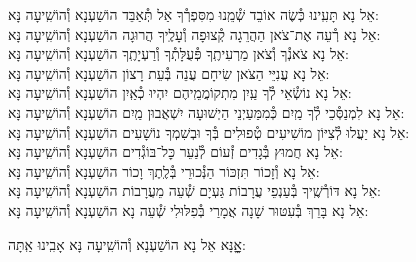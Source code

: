 \documentclass[twoside, openany, parskip=half, 11pt]{book}
\begin{document}
\begin{small}
אֵל נָא תָּעִֽינוּ כְּ֯שֶׂה אוֹבֵד שְׁ֯מֵֽנוּ מִסִּפְרְ֯ךָ אַל תְּ֯אַבֵּד \hfill הוֹשַׁעְנָא וְ֯הוֹשִֽׁיעָה נָּא: \\
אֵל נָא רְ֯עֵה אֶת־צֹאן הַהֲרֵגָה קְ֯צוּפָה וְ֯עָלֶֽיךָ הֲרוּגָה \hfill הוֹשַׁעְנָא וְ֯הוֹשִֽׁיעָה נָּא:\\
אֵל נָא צֹאנְ֯ךָ וְ֯צֹאן מַרְעִיתֶֽךָ פְּ֯עֻלָּתְ֯ךָ וְ֯רַעְיָתֶֽךָ \hfill הוֹשַׁעְנָא וְ֯הוֹשִֽׁיעָה נָּא:\\
אֵל נָא עֲנִיֵּי הַצֹּאן שִׂיחָם עֲנֵה בְּ֯עֵת רָצוֹן \hfill הוֹשַׁעְנָא וְ֯הוֹשִֽׁיעָה נָּא:\\
אֵל נָא נוֹשְׂ֯אֵי לְ֯ךָ עַֽיִן מִתְקוֹמֲמֵֽיהֶם יִהְיוּ כְ֯אַֽיִן \hfill הוֹשַׁעְנָא וְ֯הוֹשִֽׁיעָה נָּא:\\
אֵל נָא לִמְנַסְּ֯כֵי לְ֯ךָ מַֽיִם כְּ֯מִמַּעַיְנֵי הַיְשׁוּעָה יִשְׁאֲבוּן מַֽיִם \hfill הוֹשַׁעְנָא וְ֯הוֹשִֽׁיעָה נָּא:\\
אֵל נָא יַעֲלוּ לְ֯צִיּוֹן מוֹשִׁיעִים טְ֯פוּלִים בְּ֯ךָ וּבְשִׁמְךָ נוֹשָׁעִים \hfill הוֹשַׁעְנָא וְ֯הוֹשִֽׁיעָה נָּא:\\
אֵל נָא חֲמוּץ בְּ֯גָדִים זְ֯עוֹם לְ֯נַעֵר כׇּל־בּוֹגְ֯דִים \hfill הוֹשַׁעְנָא וְ֯הוֹשִֽׁיעָה נָּא:\\
אֵל נָא וְ֯זָכוֹר תִּזְכּוֹר הַנְּ֯כוּרֵי בְּ֯לֶֽתֶךְ וָכוֹר \hfill הוֹשַׁעְנָא וְ֯הוֹשִֽׁיעָה נָּא:\\
אֵל נָא דּוֹרְ֯שֶֽׁיךָ בְּ֯עַנְפֵי עֲרָבוֹת גַּעְיָם שְׁ֯עֵה מֵעֲרָבוֹת \hfill הוֹשַׁעְנָא וְ֯הוֹשִֽׁיעָה נָּא:\\
אֵל נָא בָּרֵךְ בְּ֯עִטּוּר שָׁנָה אֲמָרַי בְּ֯פִלּוּלִי שְׁ֯עֵה נָא \hfill הוֹשַׁעְנָא וְ֯הוֹשִֽׁיעָה נָּא:

\end{small}

\begin{large}
\shatzvkahal
אׇׇׇׇנָּא אֵל נָא הוֹשַׁעְנָא וְ֯הוֹשִֽׁיעָה נָּא אָבִֽינוּ אַֽתָּה:

\end{large}
\end{document}
